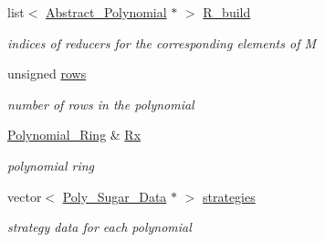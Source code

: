 \begin{DoxyCompactItemize}
\mbox{\label{group___g_b_computation_a03bda496da1d09c73151ba42b6db7bc4}} 
list$<$ \hyperlink{group__polygroup_class_abstract___polynomial}{Abstract\+\_\+\+Polynomial} $\ast$ $>$ \hyperlink{group___g_b_computation_a03bda496da1d09c73151ba42b6db7bc4}{R\+\_\+build}
\begin{DoxyCompactList}\small\item\em indices of reducers for the corresponding elements of {\ttfamily M} \end{DoxyCompactList}\item 
\mbox{\label{group___g_b_computation_ae894400dbbec3bfc9e525b1b7fdd4032}} 
unsigned \hyperlink{group___g_b_computation_ae894400dbbec3bfc9e525b1b7fdd4032}{rows}
\begin{DoxyCompactList}\small\item\em number of rows in the polynomial \end{DoxyCompactList}\item 
\mbox{\label{group___g_b_computation_a4a1dcdff469ec1061109dc33aaceb011}} 
\hyperlink{group__polygroup_class_polynomial___ring}{Polynomial\+\_\+\+Ring} \& \hyperlink{group___g_b_computation_a4a1dcdff469ec1061109dc33aaceb011}{Rx}
\begin{DoxyCompactList}\small\item\em polynomial ring \end{DoxyCompactList}\item 
\mbox{\label{group___g_b_computation_a7536f2bbcdcfcadd45c209694c31e3a4}} 
vector$<$ \hyperlink{group__strategygroup_class_poly___sugar___data}{Poly\+\_\+\+Sugar\+\_\+\+Data} $\ast$ $>$ \hyperlink{group___g_b_computation_a7536f2bbcdcfcadd45c209694c31e3a4}{strategies}
\begin{DoxyCompactList}\small\item\em strategy data for each polynomial \end{DoxyCompactList}\end{DoxyCompactItemize}


